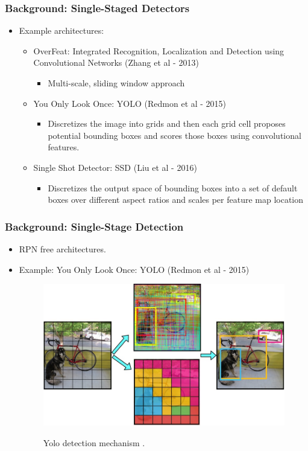 \documentclass[10pt,fleqn,unknownkeysallowed]{beamer}
\begin{document}
\begin{frame}
	\frametitle{Background: Single-Staged Detectors}
	\linespread{1.5}
	\begin{itemize}
		\item{Example architectures:}
		\begin{itemize}
			\item{OverFeat: Integrated Recognition, Localization and Detection using Convolutional Networks (Zhang et al - 2013)}
			\begin{itemize}
				\item{Multi-scale, sliding window approach}
			\end{itemize}
			\item{You Only Look Once: YOLO (Redmon et al - 2015)}
			\begin{itemize}
				\item{Discretizes the image into
					grids and then each grid cell proposes potential bounding boxes and scores those boxes
					using convolutional features.}
			\end{itemize}
			\item{Single Shot Detector: SSD (Liu et al - 2016)}
			\begin{itemize}
				\item{Discretizes the output space of bounding boxes into a set of default boxes over
					different aspect ratios and scales per feature map location}
			\end{itemize}
		\end{itemize}
	\end{itemize}
\end{frame}

\begin{frame}
	\frametitle{Background: Single-Stage Detection}
	\begin{itemize}
		\item{RPN free architectures.}
		\item{Example: You Only Look Once: YOLO (Redmon et al - 2015)}
		\begin{figure}
			\begin{center}
				\includegraphics[width=0.8\linewidth]{images/yolo_concept} \\
				\caption{Yolo detection mechanism \cite{redmon2016you}.}
			\end{center}
		\end{figure}
	\end{itemize}
\end{frame}
\end{document}
